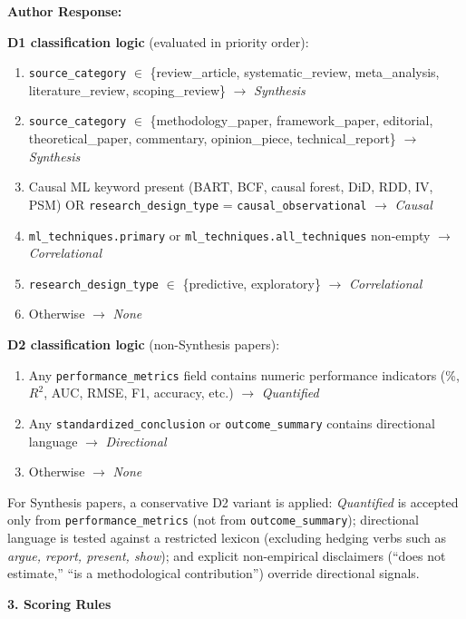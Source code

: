 \documentclass[12pt, a4paper]{article}
\newenvironment{authorresponse}{%
  \begin{mdframed}[linecolor=authorcolor, linewidth=1pt,
    backgroundcolor=authorcolor!5, innertopmargin=8pt, innerbottommargin=8pt]
  \color{authorcolor}\textbf{Author Response:}\normalcolor\par\smallskip
}{%
  \end{mdframed}\bigskip
}
\begin{document}
\begin{authorresponse}
\medskip
\noindent\textbf{D1 classification logic} (evaluated in priority order):
\begin{enumerate}[leftmargin=*]
  \item \texttt{source\_category} $\in$ \{review\_article,
    systematic\_review, meta\_analysis, literature\_review,
    scoping\_review\} $\to$ \textit{Synthesis}
  \item \texttt{source\_category} $\in$ \{methodology\_paper,
    framework\_paper, editorial, theoretical\_paper, commentary,
    opinion\_piece, technical\_report\} $\to$ \textit{Synthesis}
  \item Causal ML keyword present (BART, BCF, causal forest, DiD,
    RDD, IV, PSM) OR \texttt{research\_design\_type} =
    \texttt{causal\_observational} $\to$ \textit{Causal}
  \item \texttt{ml\_techniques.primary} or
    \texttt{ml\_techniques.all\_techniques} non-empty $\to$
    \textit{Correlational}
  \item \texttt{research\_design\_type} $\in$ \{predictive,
    exploratory\} $\to$ \textit{Correlational}
  \item Otherwise $\to$ \textit{None}
\end{enumerate}

\noindent\textbf{D2 classification logic} (non-Synthesis papers):
\begin{enumerate}[leftmargin=*]
  \item Any \texttt{performance\_metrics} field contains numeric
    performance indicators (\%, $R^2$, AUC, RMSE, F1, accuracy,
    etc.) $\to$ \textit{Quantified}
  \item Any \texttt{standardized\_conclusion} or
    \texttt{outcome\_summary} contains directional language $\to$
    \textit{Directional}
  \item Otherwise $\to$ \textit{None}
\end{enumerate}

For Synthesis papers, a conservative D2 variant is applied:
\textit{Quantified} is accepted only from \texttt{performance\_metrics}
(not from \texttt{outcome\_summary}); directional language is tested
against a restricted lexicon (excluding hedging verbs such as \textit{argue,
report, present, show}); and explicit non-empirical disclaimers
(``does not estimate,'' ``is a methodological contribution'') override
directional signals.

\medskip
\noindent\textbf{3. Scoring Rules}


\end{authorresponse}
\end{document}
